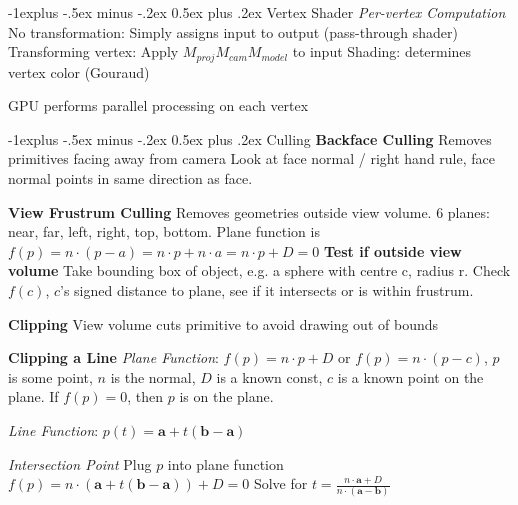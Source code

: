 \documentclass[letterpaper, 8pt]{extarticle}
\makeatletter
\renewcommand{\subsection}{\@startsection{subsection}{2}{0mm}%
                                {-1explus -.5ex minus -.2ex}%
                                {0.5ex plus .2ex}%
                                {\normalfont\tiny\bfseries}}
\makeatother
\begin{document}
\begin{multicols*}{4}
\subsection{Vertex Shader}
\textit{Per-vertex Computation}
No transformation: Simply assigns input to output (pass-through shader)
Transforming vertex: Apply \(M_{proj} M_{cam} M_{model}\) to input
Shading: determines vertex color (Gouraud)

GPU performs parallel processing on each vertex

\subsection{Culling}
\textbf{Backface Culling}
Removes primitives facing away from camera
Look at face normal / right hand rule,
face normal points in same direction as face.

\textbf{View Frustrum Culling}
Removes geometries outside view volume.
6 planes: near, far, left, right, top, bottom.
Plane function is
\(
f(p) = n \cdot (p - a)
= n \cdot p + n \cdot a
= n \cdot p + D
= 0
\)
\textbf{Test if outside view volume}
Take bounding box of object, e.g. a sphere with centre c, radius r.
Check \(f(c)\), \(c\)'s signed distance to plane, see if it intersects or is within frustrum.

\textbf{Clipping}
View volume cuts primitive to avoid drawing out of bounds

\textbf{Clipping a Line}
\textit{Plane Function}:
\(f(p) = n \cdot p + D\) or \(f(p) = n \cdot (p - c)\), \(p\) is some point,
\(n\) is the normal, \(D\) is a known const, $c$ is a known point on the plane. If $f(p) = 0$, then $p$ is on the plane.

\textit{Line Function}:
\(p(t) = \mathbf{a} + t (\mathbf{b} - \mathbf{a})\)

\textit{Intersection Point}
Plug \(p\) into plane function \(f(p) = n \cdot (\mathbf{a} + t(\mathbf{b} - \mathbf{a})) + D = 0\)
Solve for \(t = \frac{n \cdot \textbf{a} + D}{n \cdot (\textbf{a} - \textbf{b})}\)


\end{multicols*}
\end{document}
